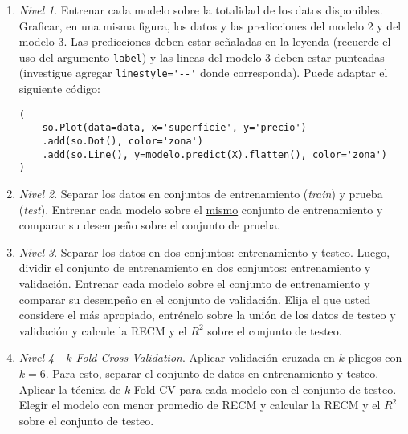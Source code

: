 \documentclass[a4paper,11pt]{article}
\theoremstyle{definition}
\begin{document}
\begin{enumerate}
\begin{enumerate}
    \item \textit{Nivel 1}. Entrenar cada modelo sobre la totalidad de los datos disponibles. Graficar, en una misma figura, los datos y las predicciones del modelo 2 y del modelo 3. Las predicciones deben estar señaladas en la leyenda (recuerde el uso del argumento \verb|label|) y las lineas del modelo 3 deben estar punteadas (investigue agregar \verb|linestyle='--'| donde corresponda). Puede adaptar el siguiente c\'odigo:
\begin{lstlisting}
(
    so.Plot(data=data, x='superficie', y='precio')
    .add(so.Dot(), color='zona')
    .add(so.Line(), y=modelo.predict(X).flatten(), color='zona')
)
\end{lstlisting}
\item \textit{Nivel 2}. Separar los datos en conjuntos de entrenamiento (\textit{train}) y prueba (\textit{test}). Entrenar cada modelo sobre el \underline{mismo} conjunto de entrenamiento y comparar su desempeño sobre el conjunto de prueba.
\item \textit{Nivel 3}. Separar los datos en dos conjuntos: entrenamiento y testeo. Luego, dividir el conjunto de entrenamiento en dos conjuntos: entrenamiento y validaci\'on. Entrenar cada modelo sobre el conjunto de entrenamiento y comparar su desempeño en el conjunto de validación. Elija el que usted considere el más apropiado, entrénelo sobre la unión de los datos de testeo y validación  y calcule la RECM y el $R^2$ sobre el conjunto de testeo.
\item \textit{Nivel 4 - $k$-Fold Cross-Validation}. Aplicar validaci\'on cruzada en $k$ pliegos con $k=6$. Para esto, separar el conjunto de datos en entrenamiento y testeo. Aplicar la t\'ecnica de $k$-Fold CV para cada modelo con el conjunto de testeo. Elegir el modelo con menor promedio de RECM y calcular la RECM y el $R^2$ sobre el conjunto de testeo.
\end{enumerate}
\end{enumerate}
\end{document}
